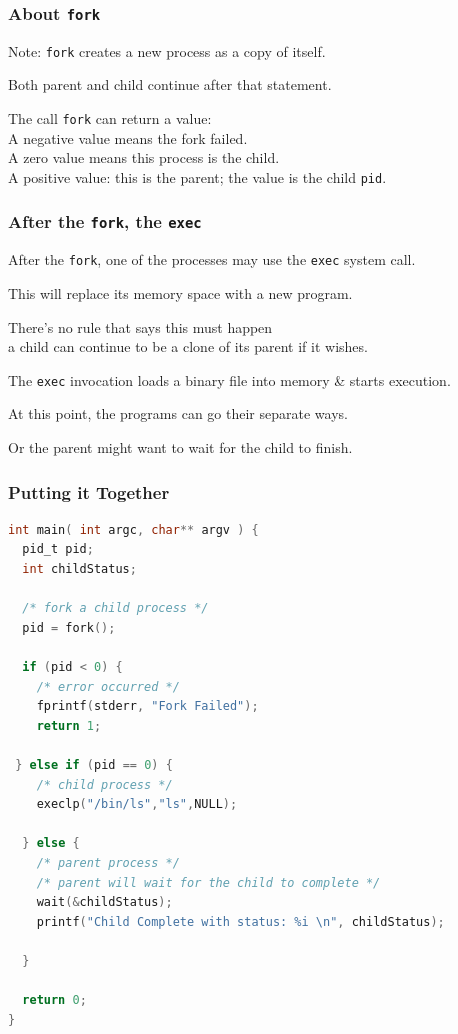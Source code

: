 \begin{frame}
\frametitle{About \texttt{fork}}

Note: \texttt{fork} creates a new process as a copy of itself.

Both parent and child continue after that statement.

The call \texttt{fork} can return a value:\\
\quad A negative value means the fork failed.\\
\quad A zero value means this process is the child.\\
\quad A positive value: this is the parent; the value is the child \texttt{pid}.

\end{frame}

\begin{frame}
\frametitle{After the \texttt{fork}, the \texttt{exec}}


After the \texttt{fork}, one of the processes may use the \texttt{exec} system call.

This will replace its memory space with a new program. 

There's no rule that says this must happen\\
\quad a child can continue to be a clone of its parent if it wishes.

The \texttt{exec} invocation loads a binary file into memory \& starts execution. 

At this point, the programs can go their separate ways.

Or the parent might want to wait for the child to finish.


\end{frame}

\begin{frame}[fragile]
\frametitle{Putting it Together}

{\scriptsize
\begin{lstlisting}[language=C]
int main( int argc, char** argv ) {
  pid_t pid;
  int childStatus;

  /* fork a child process */
  pid = fork();
  
  if (pid < 0) { 
    /* error occurred */ 
    fprintf(stderr, "Fork Failed"); 
    return 1;
  
 } else if (pid == 0) {    
    /* child process */
    execlp("/bin/ls","ls",NULL);
    
  } else {    
    /* parent process */
    /* parent will wait for the child to complete */
    wait(&childStatus);
    printf("Child Complete with status: %i \n", childStatus);
    
  }
    
  return 0;
}
\end{lstlisting}
}

\end{frame}

